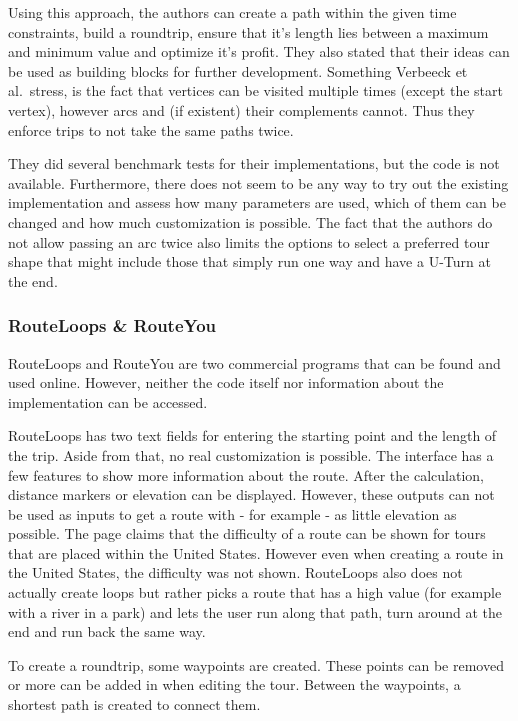 Using this approach, the authors can create a path within the given time constraints, build a roundtrip, ensure that it's length lies between a maximum and minimum value and optimize it's profit.
They also stated that their ideas can be used as \glqq building blocks\grqq{}  \cite{verbeeck_extension_2014} for further development.
Something Verbeeck et al.\ stress, is the fact that vertices can be visited multiple times (except the start vertex), however arcs and (if existent) their complements cannot. 
Thus they enforce trips to not take the same paths twice.

They did several benchmark tests for their implementations, but the code is not available.
Furthermore, there does not seem to be any way to try out the existing implementation and assess how many parameters are used, which of them can be changed and how much customization is possible.
The fact that the authors do not allow passing an arc twice also limits the options to select a preferred tour shape that might include those that simply run one way and have a U-Turn at the end. 


\subsubsection{RouteLoops \& RouteYou}
\label{subsubsec:routeLoopsrouteYou}

RouteLoops and RouteYou are two commercial programs that can be found and used online. 
However, neither the code itself nor information about the implementation can be accessed.

RouteLoops has two text fields for entering the starting point and the length of the trip.
Aside from that, no real customization is possible.
The interface has a few features to show more information about the route.
After the calculation, distance markers or elevation can be displayed.
However, these outputs can not be used as inputs to get a route with - for example - as little elevation as possible.
The page claims that the difficulty of a route can be shown for tours that are placed within the United States.
However even when creating a route in the United States, the difficulty was not shown. 
RouteLoops also does not actually create loops but rather picks a route that has a high value (for example with a river in a park) and lets the user run along that path, turn around at the end and run back the same way.

To create a roundtrip, some waypoints are created. 
These points can be removed or more can be added in when editing the tour.
Between the waypoints, a shortest path is created to connect them. 

